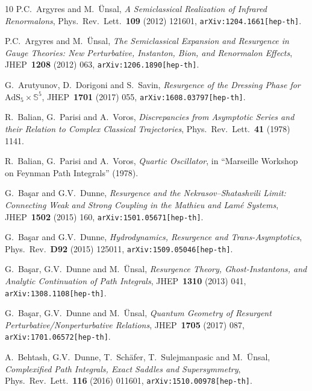 \documentclass[11pt,a4paper]{article}
\def\BS{{\mathbb S}}
\begin{document}
\begin{thebibliography}{10}
P.C.~Argyres and M.~\"Unsal,
\textit{A Semiclassical Realization of Infrared Renormalons},
Phys.\ Rev.\ Lett.\ \textbf{109} (2012) 121601,
\texttt{arXiv:1204.1661[hep-th]}. 

P.C.~Argyres and M.~\"Unsal,
\textit{The Semiclassical Expansion and Resurgence in Gauge Theories: New Perturbative, Instanton, Bion, and Renormalon Effects},
JHEP\ \textbf{1208} (2012) 063,
\texttt{arXiv:1206.1890[hep-th]}.

G.~Arutyunov, D.~Dorigoni and S.~Savin,
\textit{Resurgence of the Dressing Phase for $\mathrm{AdS}_5 \times \BS^5$},
JHEP\ \textbf{1701} (2017) 055,
\texttt{arXiv:1608.03797[hep-th]}.

R.~Balian, G.~Parisi and A.~Voros,
\textit{Discrepancies from Asymptotic Series and their Relation to Complex Classical Trajectories},
Phys.\ Rev.\ Lett.\ \textbf{41} (1978) 1141.

R.~Balian, G.~Parisi and A.~Voros,
\textit{Quartic Oscillator},
in ``Marseille Workshop on Feynman Path Integrals'' (1978).

G.~Ba\c sar and G.V.~Dunne,
\textit{Resurgence and the Nekrasov--Shatashvili Limit: Connecting Weak and Strong Coupling in the Mathieu and Lam\'e Systems},
JHEP\ \textbf{1502} (2015) 160,
\texttt{arXiv:1501.05671[hep-th]}.

G.~Ba\c sar and G.V.~Dunne,
\textit{Hydrodynamics, Resurgence and Trans-Asymptotics},
Phys.\ Rev.\ \textbf{D92} (2015) 125011,
\texttt{arXiv:1509.05046[hep-th]}.

G.~Ba\c sar, G.V.~Dunne and M.~\"Unsal,
\textit{Resurgence Theory, Ghost-Instantons, and Analytic Continuation of Path Integrals},
JHEP\ \textbf{1310} (2013) 041,
\texttt{arXiv:1308.1108[hep-th]}.

G.~Ba\c sar, G.V.~Dunne and M.~\"Unsal,
\textit{Quantum Geometry of Resurgent Perturbative/Nonperturbative Relations},
JHEP\ \textbf{1705} (2017) 087,
\texttt{arXiv:1701.06572[hep-th]}.

A.~Behtash, G.V.~Dunne, T.~Sch\"afer, T.~Sulejmanpasic and M.~\"Unsal,
\textit{Complexified Path Integrals, Exact Saddles and Supersymmetry},
Phys.\ Rev.\ Lett.\ \textbf{116} (2016) 011601,
\texttt{arXiv:1510.00978[hep-th]}.


\end{thebibliography}
\end{document}
